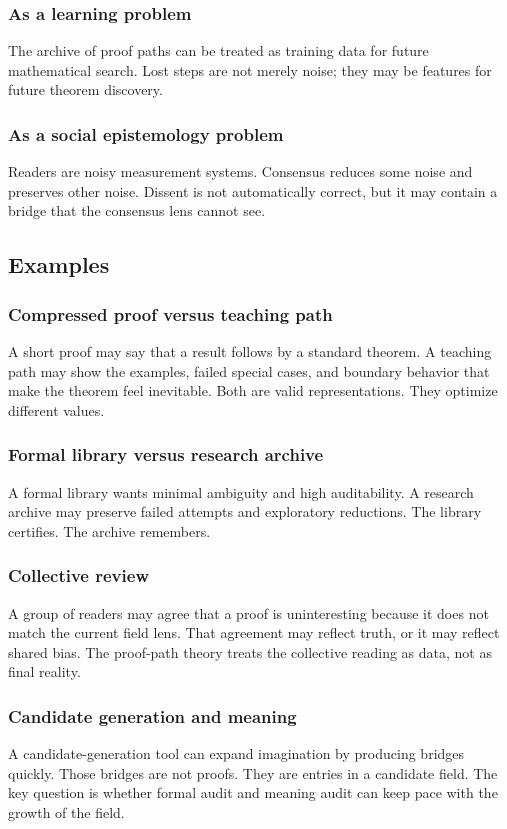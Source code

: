 \documentclass[11pt]{article}
\theoremstyle{definition}
\theoremstyle{remark}
\begin{document}
\subsubsection{As a learning problem}
The archive of proof paths can be treated as training data for future mathematical search.  Lost steps are not merely noise; they may be features for future theorem discovery.

\subsubsection{As a social epistemology problem}
Readers are noisy measurement systems.  Consensus reduces some noise and preserves other noise.  Dissent is not automatically correct, but it may contain a bridge that the consensus lens cannot see.

\subsection{Examples}

\subsubsection{Compressed proof versus teaching path}
A short proof may say that a result follows by a standard theorem.  A teaching path may show the examples, failed special cases, and boundary behavior that make the theorem feel inevitable.  Both are valid representations.  They optimize different values.

\subsubsection{Formal library versus research archive}
A formal library wants minimal ambiguity and high auditability.  A research archive may preserve failed attempts and exploratory reductions.  The library certifies.  The archive remembers.

\subsubsection{Collective review}
A group of readers may agree that a proof is uninteresting because it does not match the current field lens.  That agreement may reflect truth, or it may reflect shared bias.  The proof-path theory treats the collective reading as data, not as final reality.

\subsubsection{Candidate generation and meaning}
A candidate-generation tool can expand imagination by producing bridges quickly.  Those bridges are not proofs.  They are entries in a candidate field.  The key question is whether formal audit and meaning audit can keep pace with the growth of the field.
\end{document}
